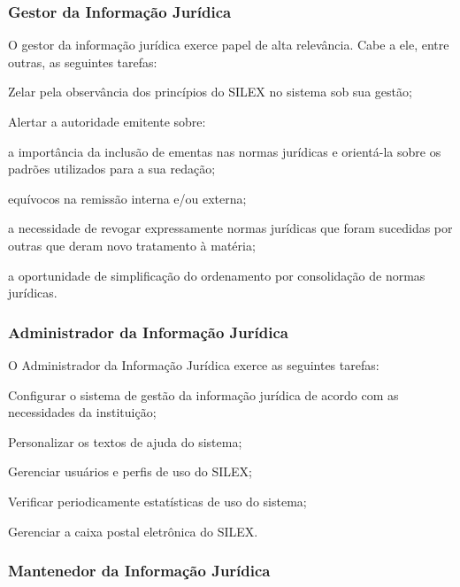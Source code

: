 \documentclass[a4paper,11pt,openright,twoside,english,brazil]{abntex2}
\begin{document}
\subsubsection{Gestor da Informação Jurídica}
\label{sec-papel-gestor}

O gestor da informação jurídica exerce papel de alta relevância. Cabe a ele,
entre outras, as seguintes tarefas:

\begin{alineas}
  \item Zelar pela observância dos princípios do SILEX no sistema sob sua
  gestão;
  \item Alertar a autoridade emitente sobre:
  \begin{incisos}
    \item a importância da inclusão de ementas nas normas jurídicas e orientá-la
    sobre os padrões utilizados para a sua redação;
    \item equívocos na remissão interna e/ou externa;
    \item a necessidade de revogar expressamente normas jurídicas que foram
    sucedidas por outras que deram novo tratamento à matéria;
    \item a oportunidade de simplificação do ordenamento por consolidação de
    normas jurídicas.
  \end{incisos}
\end{alineas}

\subsubsection{Administrador da Informação Jurídica}
\label{sec-papel-adm-info}

O Administrador da Informação Jurídica exerce as seguintes tarefas:

\begin{alineas}
 \item Configurar o sistema de gestão da informação jurídica de acordo com as
 necessidades da instituição;
 \item Personalizar os textos de ajuda do sistema;
 \item Gerenciar usuários e perfis de uso do SILEX;
 \item Verificar periodicamente estatísticas de uso do sistema;
 \item Gerenciar a caixa postal eletrônica do SILEX.
\end{alineas}

\subsubsection{Mantenedor da Informação Jurídica}
\label{sec-papel-mantenedor-info}
\end{document}
